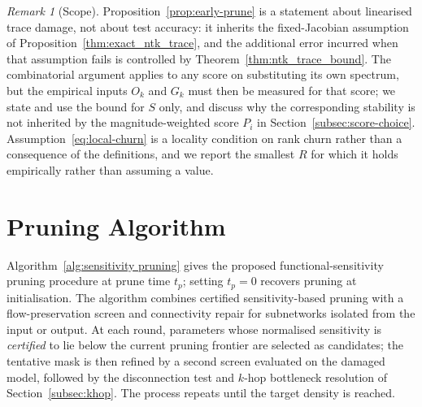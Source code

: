 \documentclass{article}
\theoremstyle{definition}
\theoremstyle{remark}
\newtheorem{remark}[theorem]{Remark}
\begin{document}
\begin{remark}[Scope]
Proposition~\ref{prop:early-prune} is a statement about linearised trace damage,
not about test accuracy: it inherits the fixed-Jacobian assumption of
Proposition~\ref{thm:exact_ntk_trace}, and the additional error incurred when
that assumption fails is controlled by Theorem~\ref{thm:ntk_trace_bound}. The
combinatorial argument applies to any score on substituting its own spectrum,
but the empirical inputs $O_k$ and $G_k$ must then be measured for that score;
we state and use the bound for $S$ only, and discuss why the corresponding
stability is not inherited by the magnitude-weighted score $P_i$ in
Section~\ref{subsec:score-choice}. Assumption~\eqref{eq:local-churn} is a
locality condition on rank churn rather than a consequence of the definitions,
and we report the smallest $R$ for which it holds empirically rather than
assuming a value.
\end{remark}

\section{Pruning Algorithm}

Algorithm~\ref{alg:sensitivity pruning} gives the proposed
functional-sensitivity pruning procedure at prune time $t_p$; setting $t_p=0$
recovers pruning at initialisation. The algorithm combines certified
sensitivity-based pruning with a flow-preservation screen and connectivity
repair for subnetworks isolated from the input or output. At each round,
parameters whose normalised sensitivity is \emph{certified} to lie below the
current pruning frontier are selected as candidates; the tentative mask is then
refined by a second screen evaluated on the damaged model, followed by the
disconnection test and $k$-hop bottleneck resolution of
Section~\ref{subsec:khop}. The process repeats until the target density is
reached.
\end{document}

